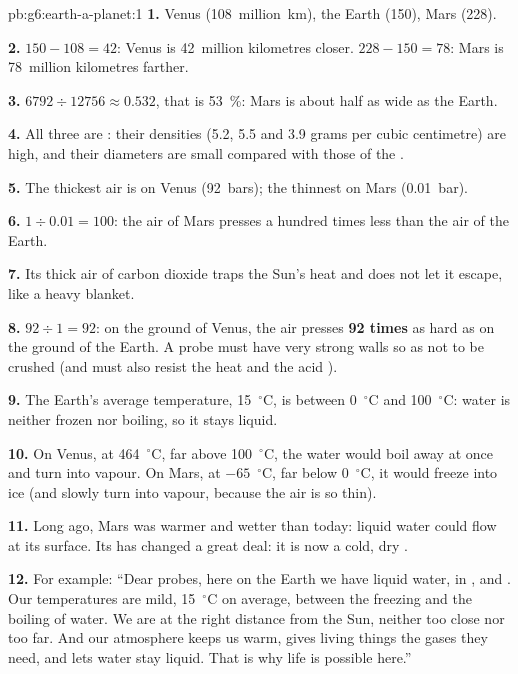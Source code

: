 \begin{solution}{pb:g6:earth-a-planet:1}
\textbf{1.} Venus (108~million~km), the Earth (150), Mars (228).

\textbf{2.} $150 - 108 = 42$: Venus is 42~million kilometres closer.
$228 - 150 = 78$: Mars is 78~million kilometres farther.

\textbf{3.} $6792 \div 12756 \approx 0.532$, that is 53~\%: Mars is about
half as wide as the Earth.

\textbf{4.} All three are : their densities (5.2, 5.5 and 3.9
grams per cubic centimetre) are high, and their diameters are small
compared with those of the .

\textbf{5.} The thickest air is on Venus (92~bars); the thinnest on Mars
(0.01~bar).

\textbf{6.} $1 \div 0.01 = 100$: the air of Mars presses a hundred times
less than the air of the Earth.

\textbf{7.} Its thick air of carbon dioxide traps the Sun's heat and does
not let it escape, like a heavy blanket.

\textbf{8.} $92 \div 1 = 92$: on the ground of Venus, the air presses
\textbf{92 times} as hard as on the ground of the Earth. A probe must have
very strong walls so as not to be crushed (and must also resist the heat
and the acid ).

\textbf{9.} The Earth's average temperature, 15~$^\circ$C, is between
0~$^\circ$C and 100~$^\circ$C: water is neither frozen nor boiling, so it
stays liquid.

\textbf{10.} On Venus, at 464~$^\circ$C, far above 100~$^\circ$C, the water
would boil away at once and turn into vapour. On Mars, at $-65$~$^\circ$C,
far below 0~$^\circ$C, it would freeze into ice (and slowly turn into
vapour, because the air is so thin).

\textbf{11.} Long ago, Mars was warmer and wetter than today: liquid water
could flow at its surface. Its  has changed a great deal: it is now
a cold, dry .

\textbf{12.} For example: ``Dear probes, here on the Earth we have liquid
water, in ,  and . Our temperatures are mild, 15~$^\circ$C
on average, between the freezing and the boiling of water. We are at the
right distance from the Sun, neither too close nor too far. And our
atmosphere keeps us warm, gives living things the gases they need, and lets
water stay liquid. That is why life is possible here.''
\end{solution}
